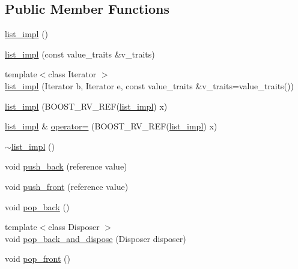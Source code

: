 \subsection*{Public Member Functions}
\begin{DoxyCompactItemize}
\item 
\hyperlink{classboost_1_1intrusive_1_1list__impl_a4700da87f6258203c4450d637eef77b3}{list\+\_\+impl} ()
\item 
\hyperlink{classboost_1_1intrusive_1_1list__impl_aec7438abf9f510b1bea085bf3ab562e9}{list\+\_\+impl} (const value\+\_\+traits \&v\+\_\+traits)
\item 
{\footnotesize template$<$class Iterator $>$ }\\\hyperlink{classboost_1_1intrusive_1_1list__impl_a7d841d7401e3bdac5353785ceb4e8faf}{list\+\_\+impl} (Iterator b, Iterator e, const value\+\_\+traits \&v\+\_\+traits=value\+\_\+traits())
\item 
\hyperlink{classboost_1_1intrusive_1_1list__impl_af87baafc7d3c1ada9da405928dd7d59a}{list\+\_\+impl} (B\+O\+O\+S\+T\+\_\+\+R\+V\+\_\+\+R\+EF(\hyperlink{classboost_1_1intrusive_1_1list__impl}{list\+\_\+impl}) x)
\item 
\hyperlink{classboost_1_1intrusive_1_1list__impl}{list\+\_\+impl} \& \hyperlink{classboost_1_1intrusive_1_1list__impl_a8999914d675056b42a4e1d5a40fceb1b}{operator=} (B\+O\+O\+S\+T\+\_\+\+R\+V\+\_\+\+R\+EF(\hyperlink{classboost_1_1intrusive_1_1list__impl}{list\+\_\+impl}) x)
\item 
\hyperlink{classboost_1_1intrusive_1_1list__impl_a142512d008d927a564d1785ac39ebb6a}{$\sim$list\+\_\+impl} ()
\item 
void \hyperlink{classboost_1_1intrusive_1_1list__impl_a486bb7078d16bbe0e569dbd8a16ef104}{push\+\_\+back} (reference value)
\item 
void \hyperlink{classboost_1_1intrusive_1_1list__impl_ae11db4262630360dd6080aebdbd01ce8}{push\+\_\+front} (reference value)
\item 
void \hyperlink{classboost_1_1intrusive_1_1list__impl_a02b94ea6055095b6ed262820cc28b739}{pop\+\_\+back} ()
\item 
{\footnotesize template$<$class Disposer $>$ }\\void \hyperlink{classboost_1_1intrusive_1_1list__impl_ad2f45b6fd9f4d189e9f5c6fc126334b8}{pop\+\_\+back\+\_\+and\+\_\+dispose} (Disposer disposer)
\item 
void \hyperlink{classboost_1_1intrusive_1_1list__impl_aa0a3b2545ff925b8f3185ab5f4027d4e}{pop\+\_\+front} ()
\item 

\end{DoxyCompactItemize}
